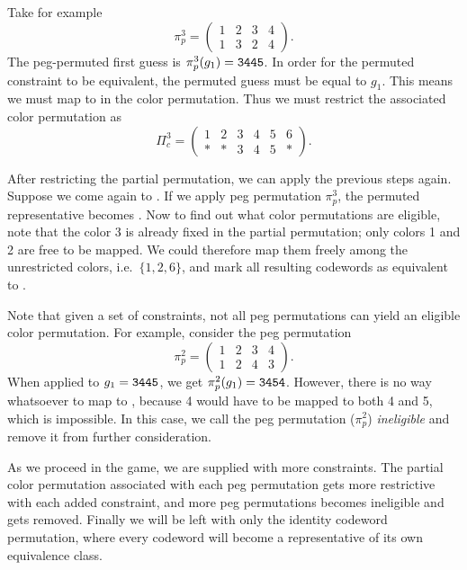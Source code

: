 Take for example 
\[
\pi_p^3 = 
\begin{pmatrix}
1 & 2 & 3 & 4 \\
1 & 3 & 2 & 4
\end{pmatrix} .
\] 
The peg-permuted first guess is $\pi_p^3(g_1) = \texttt{3445}$. In order for the permuted constraint to be equivalent, the permuted guess must be equal to $g_1$. This means we must map  to  in the color permutation. Thus we must restrict the associated color permutation as
\[
\Pi_c^3 = 
\begin{pmatrix}
1 & 2 & 3 & 4 & 5 & 6 \\
* & * & 3 & 4 & 5 & * 
\end{pmatrix} .
\]

After restricting the partial permutation, we can apply the previous steps again. Suppose we come again to . If we apply peg permutation $\pi_p^3$, the permuted representative becomes . Now to find out what color permutations are eligible, note that the color 3 is already fixed in the partial permutation; only colors 1 and 2 are free to be mapped. We could therefore map them freely among the unrestricted colors, i.e.\ $\{1, 2, 6\}$, and mark all resulting codewords as equivalent to .

Note that given a set of constraints, not all peg permutations can yield an eligible color permutation. For example, consider the peg permutation
\[
\pi_p^2 = 
\begin{pmatrix}
1 & 2 & 3 & 4 \\
1 & 2 & 4 & 3
\end{pmatrix} .
\]
When applied to $g_1 = \texttt{3445}$, we get $\pi_p^2(g_1) = \texttt{3454}$. However, there is no way whatsoever to map  to , because 4 would have to be mapped to both 4 and 5, which is impossible. In this case, we call the peg permutation ($\pi_p^2$) \emph{ineligible} and remove it from further consideration.

As we proceed in the game, we are supplied with more constraints. The partial color permutation associated with each peg permutation gets more restrictive with each
added constraint, and more peg permutations becomes ineligible and gets removed. Finally we will be left with only the identity codeword permutation, where every codeword will become a representative of its own equivalence class.

